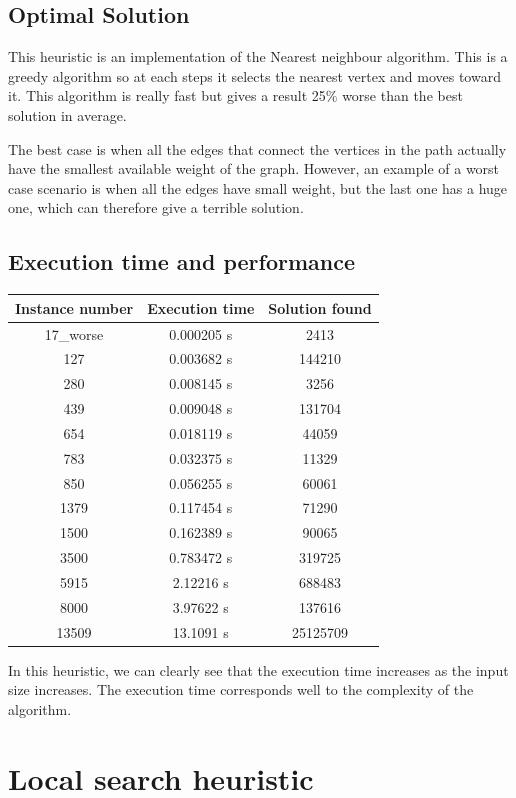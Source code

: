 \documentclass[a4paper, 12pt]{report}
\begin{document}
		\section{Optimal Solution}
		This heuristic is an implementation of the Nearest neighbour algorithm. This is a greedy algorithm so at each steps it selects the nearest vertex and moves toward it. This algorithm is really fast but gives a result 25\% worse than the best solution in average.
		
		The best case is when all the edges that connect the vertices in the path actually have the smallest available weight of the graph. However, an example of a worst case scenario is when all the edges have small weight, but the last one has a huge one, which can therefore give a terrible solution.
		\section{Execution time and performance}
		\begin{center}
			\begin{tabular}{|c|c|c|}
				\hline
				Instance number&Execution time&Solution found\\
				\hline
				17\_worse & 0.000205 s & 2413\\
				127 & 0.003682 s & 144210\\
				280 & 0.008145 s & 3256\\
				439 & 0.009048 s & 131704\\
				654 & 0.018119 s & 44059\\
				783 & 0.032375 s & 11329\\
				850 & 0.056255 s & 60061\\
				1379 & 0.117454 s & 71290\\
				1500 & 0.162389 s & 90065\\
				3500 & 0.783472 s & 319725\\
				5915 & 2.12216 s & 688483\\
				8000 & 3.97622 s & 137616\\
				13509 & 13.1091 s & 25125709\\
				\hline
			\end{tabular}
		\end{center}
		In this heuristic, we can clearly see that the execution time increases as the input size increases. The execution time corresponds well to the complexity of the algorithm.
	
	\chapter{Local search heuristic}
\end{document}

